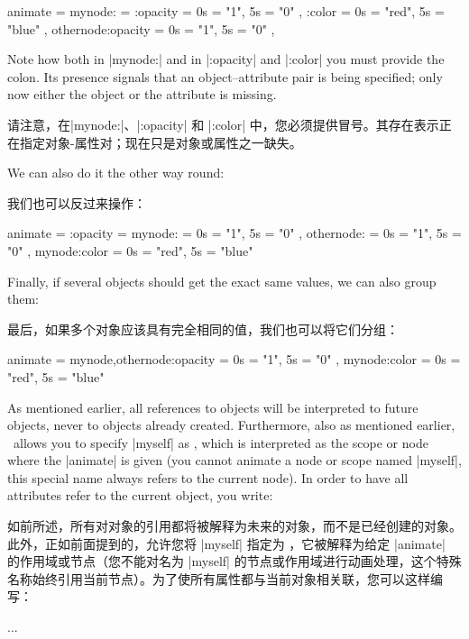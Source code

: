 \begin{codeexample}
animate = {
  mynode: = {
    :opacity        = { 0s = "1",   5s = "0" },
    :color          = { 0s = "red", 5s = "blue" }
  },
  othernode:opacity = { 0s = "1",   5s = "0" },
}
\end{codeexample}
%
Note how both in  |mynode:| and in |:opacity| and |:color| you must provide the
colon. Its presence signals that an object--attribute pair is being specified;
only now either the object or the attribute is missing.

请注意，在|mynode:|、|:opacity| 和 |:color| 中，您必须提供冒号。其存在表示正在指定对象-属性对；现在只是对象或属性之一缺失。

We can also do it the other way round:

我们也可以反过来操作：

%
\begin{codeexample}
animate = {
  :opacity = {
    mynode:         = { 0s = "1",   5s = "0" },
    othernode:      = { 0s = "1",   5s = "0" }
  },
  mynode:color      = { 0s = "red", 5s = "blue" }
}
\end{codeexample}
%
Finally, if several objects should get the exact same values, we can also group
them:

最后，如果多个对象应该具有完全相同的值，我们也可以将它们分组：


\begin{codeexample}
animate = {
  {mynode,othernode}:opacity = { 0s = "1",   5s = "0" },
  mynode:color               = { 0s = "red", 5s = "blue" }
}
\end{codeexample}

As mentioned earlier, all references to objects will be interpreted to future
objects, never to objects already created. Furthermore, also as mentioned
earlier, \tikzname\ allows you to specify |myself| as , which is
interpreted as the scope or node where the |animate| is given (you cannot
animate a node or scope named |myself|, this special name always refers to the
current node). In order to have all attributes refer to the current object, you
write:

如前所述，所有对对象的引用都将被解释为未来的对象，而不是已经创建的对象。此外，正如前面提到的，\tikzname 允许您将 |myself| 指定为 ，它被解释为给定 |animate| 的作用域或节点（您不能对名为 |myself| 的节点或作用域进行动画处理，这个特殊名称始终引用当前节点）。为了使所有属性都与当前对象相关联，您可以这样编写：


\begin{codeexample}
\begin{scope} [animate = {
                 myself: = { %
                   :opacity = { ... },
                   :xshift  = { ... }
                 }
               }]
  ...
\end{scope}
\end{codeexample}

